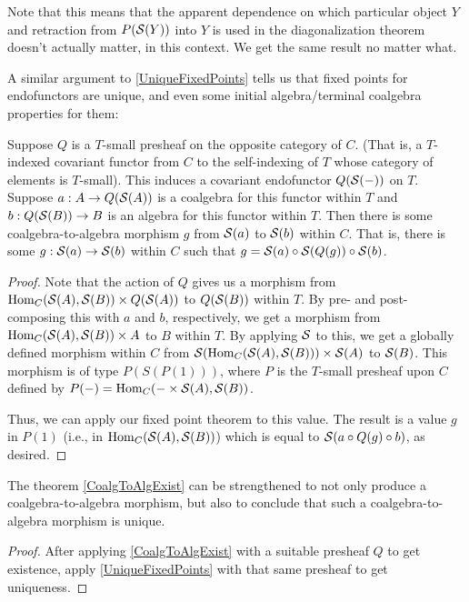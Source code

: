 \begin{observation}
Note that this means that the apparent dependence on which particular object $Y$ and retraction from $P(\mathcal{S}(Y))$ into $Y$ is used in the diagonalization theorem doesn't actually matter, in this context. We get the same result no matter what.
\end{observation}

A similar argument to \cref{UniqueFixedPoints} tells us that fixed points for endofunctors are unique, and even some initial algebra/terminal coalgebra properties for them:

\begin{theorem}\label{CoalgToAlgExist}
Suppose $Q$ is a $T$-small presheaf on the opposite category of $C$. (That is, a $T$-indexed covariant functor from $C$ to the self-indexing of $T$ whose category of elements is $T$-small). This induces a covariant endofunctor $Q(\mathcal{S}(-))$ on $T$. Suppose $a : A \to Q(\mathcal{S}(A))$ is a coalgebra for this functor within $T$ and $b : Q(\mathcal{S}(B)) \to B$ is an algebra for this functor within $T$. Then there is some coalgebra-to-algebra morphism $g$ from $\mathcal{S}(a)$ to $\mathcal{S}(b)$ within $C$. That is, there is some $g : \mathcal{S}(a) \to \mathcal{S}(b)$ within $C$ such that $g = \mathcal{S}(a) \circ \mathcal{S}(Q(g)) \circ \mathcal{S}(b)$.
\end{theorem}
\begin{proof}
Note that the action of $Q$ gives us a morphism from $\operatorname{Hom}_C(\mathcal{S}(A), \mathcal{S}(B)) \times Q(\mathcal{S}(A))$ to $Q(\mathcal{S}(B))$ within $T$. By pre- and post-composing this with $a$ and $b$, respectively, we get a morphism from $\operatorname{Hom}_C(\mathcal{S}(A), \mathcal{S}(B)) \times A$ to $B$ within $T$. By applying $\mathcal{S}$ to this, we get a globally defined morphism within $C$ from $\mathcal{S}(\operatorname{Hom}_C(\mathcal{S}(A), \mathcal{S}(B))) \times \mathcal{S}(A)$ to $\mathcal{S}(B)$. This morphism is of type $P(S(P(1)))$, where $P$ is the $T$-small presheaf upon $C$ defined by $P(-) = \operatorname{Hom}_C(- \times \mathcal{S}(A), \mathcal{S}(B))$.

Thus, we can apply our fixed point theorem  to this value. The result is a value $g$ in $P(1)$ (i.e., in $\operatorname{Hom}_C(\mathcal{S}(A), \mathcal{S}(B))$) which is equal to $\mathcal{S}(a \circ Q(g) \circ b)$, as desired.

\end{proof}

\begin{theorem}\label{CoalgToAlgUnique}
The theorem \cref{CoalgToAlgExist} can be strengthened to not only produce a coalgebra-to-algebra morphism, but also to conclude that such a coalgebra-to-algebra morphism is unique.
\end{theorem}
\begin{proof}
After applying \cref{CoalgToAlgExist} with a suitable presheaf $Q$ to get existence, apply \cref{UniqueFixedPoints} with that same presheaf to get uniqueness.
\end{proof}

